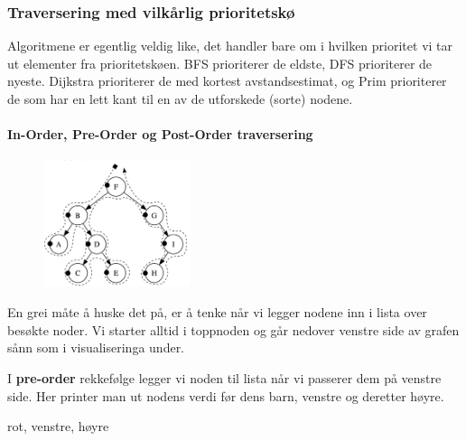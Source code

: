 \documentclass[12pt]{report}
\begin{document}
\subsubsection*{Traversering med vilkårlig prioritetskø}
Algoritmene er egentlig veldig like, det handler bare om i hvilken prioritet vi tar ut elementer fra prioritetskøen. BFS prioriterer de eldste, DFS prioriterer de nyeste. Dijkstra prioriterer de med kortest avstandsestimat, og Prim prioriterer de som har en lett kant til en av de utforskede (sorte) nodene. \par


\vspace{\baselineskip}
\paragraph*{In-Order, Pre-Order og Post-Order traversering}



\begin{figure}[H]
\advance\leftskip 5.05in		\includegraphics[width=1.7in,height=1.46in]{./media/image105.png}
\end{figure}



\setlength{\parskip}{10.56pt}
En grei måte å huske det på, er å tenke når vi legger nodene inn i lista over besøkte noder. Vi starter alltid i toppnoden og går nedover venstre side av grafen sånn som i visualiseringa under.\par

I \textbf{pre-order} rekkefølge legger vi noden til lista når vi passerer dem på venstre side. Her printer man ut nodens verdi før dens barn, venstre og deretter høyre. \par

 rot, venstre, høyre\par
\end{document}
